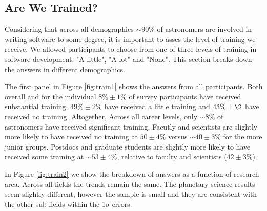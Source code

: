 \subsection{Are We Trained?}

Considering that across all demographics $\sim90\%$ of astronomers are involved in writing software to some degree, it is important to asses the level of training we receive. We allowed participants to choose from one of three levels of training in software development: "A little", "A lot" and "None". This section breaks down the answers in different demographics. 

The first panel in Figure \ref{fig:train1} shows the answers from all participants. Both overall and for the individual  $8\%\pm1\%$ of survey participants have received substantial training, $49\%\pm2\%$ have received a little training and $43\%\pm\2$ have received no training. Altogether, Across all career levels, only $\sim8\%$ of astronomers have received significant training. Facutly and scientists are slightly more likely to have received no training at $50\pm4\%$ versus $\sim40\pm3\%$ for the more junior groups. Postdocs and graduate students are slightly more likely to have received some training at $\sim53\pm4\%$, relative to faculty and scientists ($42\pm3\%$).

In Figure \ref{fig:train2} we show the breakdown of answers as a function of research area. Across all fields the trends remain the same. The planetary science results seem slightly different, however the sample is small and they are consistent with the other sub-fields within the 1$\sigma$ errors. 

